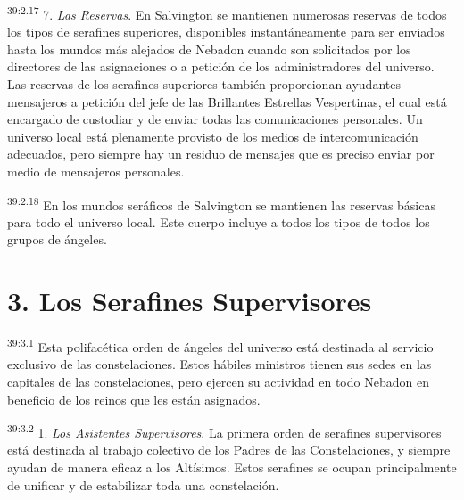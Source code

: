 \par
\textsuperscript{39:2.17} 7. \textit{Las Reservas}. En Salvington se mantienen numerosas reservas de todos los tipos de serafines superiores, disponibles instantáneamente para ser enviados hasta los mundos más alejados de Nebadon cuando son solicitados por los directores de las asignaciones o a petición de los administradores del universo. Las reservas de los serafines superiores también proporcionan ayudantes mensajeros a petición del jefe de las Brillantes Estrellas Vespertinas, el cual está encargado de custodiar y de enviar todas las comunicaciones personales. Un universo local está plenamente provisto de los medios de intercomunicación adecuados, pero siempre hay un residuo de mensajes que es preciso enviar por medio de mensajeros personales.

\par
\textsuperscript{39:2.18} En los mundos seráficos de Salvington se mantienen las reservas básicas para todo el universo local. Este cuerpo incluye a todos los tipos de todos los grupos de ángeles.

\section*{3. Los Serafines Supervisores}
\par
\textsuperscript{39:3.1} Esta polifacética orden de ángeles del universo está destinada al servicio exclusivo de las constelaciones. Estos hábiles ministros tienen sus sedes en las capitales de las constelaciones, pero ejercen su actividad en todo Nebadon en beneficio de los reinos que les están asignados.

\par
\textsuperscript{39:3.2} 1. \textit{Los Asistentes Supervisores}. La primera orden de serafines supervisores está destinada al trabajo colectivo de los Padres de las Constelaciones, y siempre ayudan de manera eficaz a los Altísimos. Estos serafines se ocupan principalmente de unificar y de estabilizar toda una constelación.

